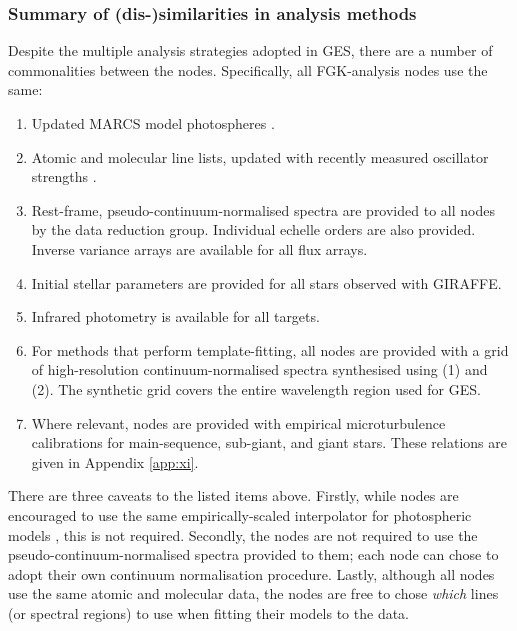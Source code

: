 \documentclass[preprint]{aastex}
\newcommand{\acronym}[1]{{\small{#1}}}
\newcommand{\ges}{\acronym{GES}}
\begin{document}


\subsubsection{Summary of (dis-)similarities in analysis methods}
\label{sec:analysis-node-similarities}

Despite the multiple analysis strategies adopted in \ges, there are a number of
commonalities between the nodes. Specifically, all FGK-analysis nodes use the same:
\begin{enumerate}
  \item Updated MARCS model photospheres \citep{BG}.
  \item Atomic and molecular line lists, updated with recently measured oscillator strengths \citep{Heiter:2016,someone}.
  \item Rest-frame, pseudo-continuum-normalised spectra are provided to all nodes by the data reduction group. Individual echelle orders are also provided. Inverse variance arrays are available for all flux arrays.
  \item Initial stellar parameters are provided for all stars observed with GIRAFFE.
  \item Infrared photometry is available for all targets.
  \item For methods that perform template-fitting, all nodes are provided with a grid of high-resolution continuum-normalised spectra synthesised using (1) and (2).  The synthetic grid covers the entire wavelength region used for \ges.
  \item Where relevant, nodes are provided with empirical microturbulence calibrations for main-sequence, sub-giant, and giant stars. These relations are given in Appendix \ref{app:xi}.
\end{enumerate}


There are three caveats to the listed items above.  Firstly, while nodes are encouraged
to use the same empirically-scaled interpolator for photospheric models \citep{Masseron:2006},
this is not required.  Secondly, the nodes are not required to use the 
pseudo-continuum-normalised spectra provided to them; each node can chose to 
adopt their own continuum normalisation procedure.  Lastly, although all nodes use the 
same atomic and molecular data, the nodes are free to chose \emph{which} lines (or 
spectral regions) to use when fitting their models to the data. 
\end{document}
